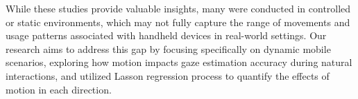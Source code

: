 While these studies provide valuable insights, many were conducted in controlled or static environments, which may not fully capture the range of movements and usage patterns associated with handheld devices in real-world settings. Our research aims to address this gap by focusing specifically on dynamic mobile scenarios, exploring how motion impacts gaze estimation accuracy during natural interactions, and utilized Lasson regression process to quantify the effects of motion in each direction.





